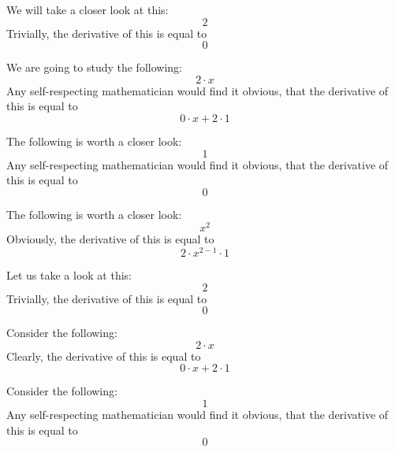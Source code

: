\documentclass{article}
\begin{document}
We will take a closer look at this:
\begin{equation}
2 
\end{equation}
Trivially, the derivative of this is equal to
\begin{equation}
0 
\end{equation}

We are going to study the following:
\begin{equation}
2 \cdot x 
\end{equation}
Any self-respecting mathematician would find it obvious, that the derivative of this is equal to
\begin{equation}
0 \cdot x + 2 \cdot 1 
\end{equation}

The following is worth a closer look:
\begin{equation}
1 
\end{equation}
Any self-respecting mathematician would find it obvious, that the derivative of this is equal to
\begin{equation}
0 
\end{equation}

The following is worth a closer look:
\begin{equation}
x ^{2 } 
\end{equation}
Obviously, the derivative of this is equal to
\begin{equation}
2 \cdot x ^{2 - 1 } \cdot 1 
\end{equation}

Let us take a look at this:
\begin{equation}
2 
\end{equation}
Trivially, the derivative of this is equal to
\begin{equation}
0 
\end{equation}

Consider the following:
\begin{equation}
2 \cdot x 
\end{equation}
Clearly, the derivative of this is equal to
\begin{equation}
0 \cdot x + 2 \cdot 1 
\end{equation}

Consider the following:
\begin{equation}
1 
\end{equation}
Any self-respecting mathematician would find it obvious, that the derivative of this is equal to
\begin{equation}
0 
\end{equation}
\end{document}
